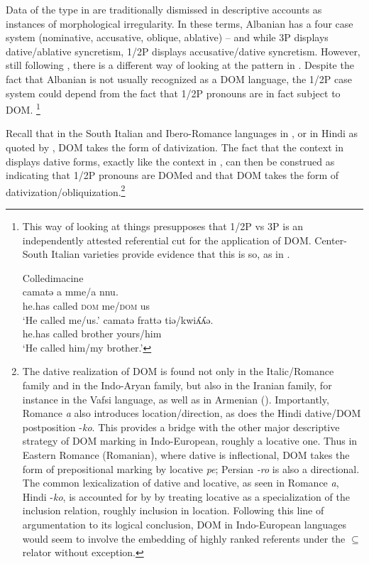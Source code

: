 \documentclass[output=paper,colorlinks,citecolor=brown,nonflat]{./langscibook}
\begin{document}
Data of the type in  are traditionally dismissed in descriptive accounts as instances of morphological irregularity. In these terms, Albanian has a four case system (nominative, accusative, oblique, ablative) – and while 3P displays dative/ablative syncretism, 1/2P displays accusative/dative syncretism. However, still following \citet{ManziniSavoia2014}, there is a different way of looking at the pattern in . Despite the fact that Albanian is not usually recognized as a DOM language, the 1/2P case system could depend from the fact that 1/2P pronouns are in fact subject to DOM.{} \footnote{This way of looking at things presupposes that 1/2P vs 3P is an independently attested referential cut for the application of DOM. Center-South Italian varieties provide  evidence that this is so, as in .

\ea \label{ex:manzini:i}%
    Colledimacine \citep{ManziniSavoia2005}\\
    \ea
     {camatə} {a} {mme/a} {nnu}.\\
        {he.has}  {called} \textsc{dom} {me/\textsc{dom}} {us}\\
    \glt ‘He called me/us.’
    \ex
       {camatə} {frattə} {tiə/kwiʎʎə}.\\
        {he.has}  called   brother yours/him\\
    \glt ‘He called him/my brother.’
    \z
\z
}

Recall that in the South Italian and Ibero-Romance languages in , or in Hindi as quoted by \citet{Torrego1998}, DOM takes the form of dativization. The fact that the context in  displays dative forms, exactly like the context in , can then be construed as indicating that 1/2P pronouns are DOMed and that DOM takes the form of dativization/obliquization.\footnote{{ The dative realization of DOM is found not only in the Italic/Romance family and in the Indo-Aryan family, but also in the Iranian family, for instance in the Vafsi language, as well as in Armenian (\citealt{ManziniFranco2016}). Importantly, Romance \textit{a} also introduces location/direction, as does the Hindi dative/DOM postposition -\textit{ko}.} This provides a bridge with the other major descriptive strategy of DOM marking in Indo-European, roughly a locative one. Thus in Eastern Romance (Romanian), where dative is inflectional, DOM takes the form of prepositional marking by locative \textit{pe}; Persian \textit{{}-ro} is also a directional.  The common lexicalization of dative and locative, as seen in Romance \textit{a}, Hindi -\textit{ko}, is accounted for by \citet{FrancoManzini2017Ins} by treating locative as a specialization of the inclusion relation, roughly inclusion in location. Following this line of argumentation to its logical conclusion, DOM in Indo-European languages would seem to involve the embedding of highly ranked referents under the \textrm{${\subseteq}$} relator without exception.}
\end{document}
